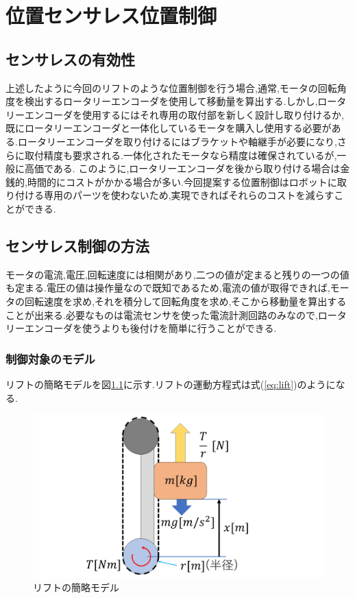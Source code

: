\chapter{位置センサレス位置制御}

\section{センサレスの有効性}上述したように今回のリフトのような位置制御を行う場合,通常,モータの回転角度を検出するロータリーエンコーダを使用して移動量を算出する.しかし,ロータリーエンコーダを使用するにはそれ専用の取付部を新しく設計し取り付けるか,既にロータリーエンコーダと一体化しているモータを購入し使用する必要がある.ロータリーエンコーダを取り付けるにはブラケットや軸継手が必要になり,さらに取付精度も要求される.一体化されたモータなら精度は確保されているが,一般に高価である.
このように,ロータリーエンコーダを後から取り付ける場合は金銭的,時間的にコストがかかる場合が多い.今回提案する位置制御はロボットに取り付ける専用のパーツを使わないため,実現できればそれらのコストを減らすことができる.

\section{センサレス制御の方法}
モータの電流,電圧,回転速度には相関があり,二つの値が定まると残りの一つの値も定まる.電圧の値は操作量なので既知であるため,電流の値が取得できれば,モータの回転速度を求め,それを積分して回転角度を求め,そこから移動量を算出することが出来る.必要なものは電流センサを使った電流計測回路のみなので,ロータリーエンコーダを使うよりも後付けを簡単に行うことができる.

\subsection{制御対象のモデル}
リフトの簡略モデルを図\ref{fig:liftModel}に示す.リフトの運動方程式は式(\ref{eq:lift})のようになる.

\begin{figure}[htbp]
  \begin{center}
    \includegraphics[width=170mm]{img/liftModel.png}
    \end{center}
  \caption{リフトの簡略モデル}
 \label{fig:liftModel}
\end{figure}

